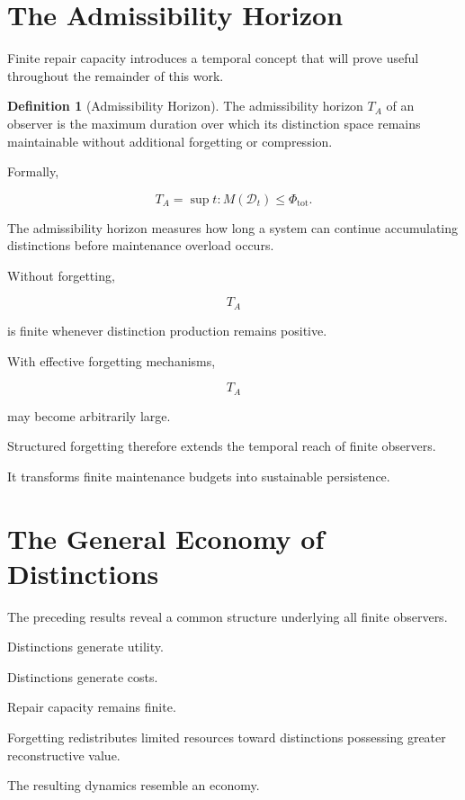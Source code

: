 \documentclass[12pt,oneside]{book}
\theoremstyle{plain} \newtheorem{theorem}{Theorem}[chapter] \newtheorem{lemma}[theorem]{Lemma} \newtheorem{proposition}[theorem]{Proposition} \newtheorem{corollary}[theorem]{Corollary}
\theoremstyle{definition} \newtheorem{definition}[theorem]{Definition} \newtheorem{axiom}[theorem]{Axiom} \newtheorem{construction}[theorem]{Construction}
\theoremstyle{remark} \newtheorem{remark}[theorem]{Remark} \newtheorem{example}[theorem]{Example}
\newcommand{\D}{\mathcal{D}} \newcommand{\R}{\mathcal{R}} \newcommand{\F}{\mathcal{F}} \newcommand{\U}{\mathcal{U}} \newcommand{\M}{\mathcal{M}} \newcommand{\G}{\Gamma}
\begin{document}
\section{The Admissibility Horizon}

Finite repair capacity introduces a temporal concept that will prove useful throughout the remainder of this work.

\begin{definition}[Admissibility Horizon]

The admissibility horizon $T_A$ of an observer is the maximum duration over which its distinction space remains maintainable without additional forgetting or compression.

\end{definition}

Formally,

\[
T_A
=
\sup
{
t
:
M(\D_t)
\leq
\Phi_{\mathrm{tot}}
}.
\]

The admissibility horizon measures how long a system can continue accumulating distinctions before maintenance overload occurs.

Without forgetting,

\[
T_A
\]

is finite whenever distinction production remains positive.

With effective forgetting mechanisms,

\[
T_A
\]

may become arbitrarily large.

Structured forgetting therefore extends the temporal reach of finite observers.

It transforms finite maintenance budgets into sustainable persistence.

\section{The General Economy of Distinctions}

The preceding results reveal a common structure underlying all finite observers.

Distinctions generate utility.

Distinctions generate costs.

Repair capacity remains finite.

Forgetting redistributes limited resources toward distinctions possessing greater reconstructive value.

The resulting dynamics resemble an economy.
\end{document}
